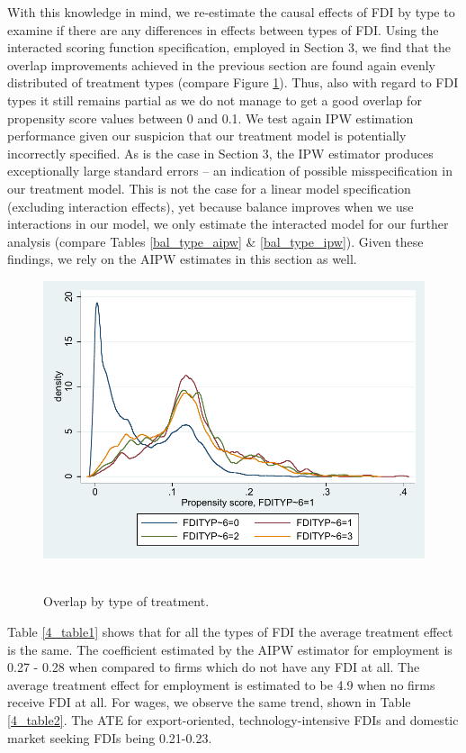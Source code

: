 With this knowledge in mind, we re-estimate the causal effects of FDI by type to examine if there are any differences in effects between types of FDI. Using the interacted scoring function specification, employed in Section 3, we find that the overlap improvements achieved in the previous section are found again evenly distributed of treatment types (compare Figure \ref{ol_aipw_type}). Thus, also with regard to FDI types it still remains partial as we do not manage to get a good overlap for propensity score values between 0 and 0.1. We test again IPW estimation performance given our suspicion that our treatment model is potentially incorrectly specified. As is the case in Section 3, the IPW estimator produces exceptionally large standard errors – an indication of possible misspecification in our treatment model. This is not the case for a linear model specification (excluding interaction effects), yet because balance improves when we use interactions in our model, we only estimate the interacted model for our further analysis (compare Tables \ref{bal_type_aipw} \& \ref{bal_type_ipw}). Given these findings, we rely on the AIPW estimates in this section as well.  

\begin{figure}
	\centering
	\includegraphics[scale=0.6]{figures_and_tables/4_overlap_aipw_typeFDI.pdf}\
	\caption{Overlap by type of treatment.}
	\label{ol_aipw_type}
\end{figure}






Table \ref{4_table1} shows that for all the types of FDI the average treatment effect is the same. The coefficient estimated by the AIPW estimator for employment is 0.27 - 0.28 when compared to firms which do not have any FDI at all. The average treatment effect for employment is estimated to be 4.9 when no firms receive FDI at all. For wages, we observe the same trend, shown in Table \ref{4_table2}. The ATE for export-oriented, technology-intensive FDIs and domestic market seeking FDIs being 0.21-0.23. 

